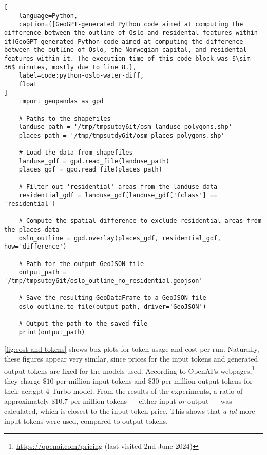 \FloatBarrier

\begin{lstlisting}[
    language=Python,
    caption={[GeoGPT-generated Python code aimed at computing the difference between the outline of Oslo and residental features within it]GeoGPT-generated Python code aimed at computing the difference between the outline of Oslo, the Norwegian capital, and residental features within it. The execution time of this code block was $\sim 36$ minutes, mostly due to line 8.},
    label=code:python-oslo-water-diff,
    float
]
    import geopandas as gpd

    # Paths to the shapefiles
    landuse_path = '/tmp/tmpsutdy6it/osm_landuse_polygons.shp'
    places_path = '/tmp/tmpsutdy6it/osm_places_polygons.shp'
    
    # Load the data from shapefiles
    landuse_gdf = gpd.read_file(landuse_path)
    places_gdf = gpd.read_file(places_path)
    
    # Filter out 'residential' areas from the landuse data
    residential_gdf = landuse_gdf[landuse_gdf['fclass'] == 'residential']
     
    # Compute the spatial difference to exclude residential areas from the places data
    oslo_outline = gpd.overlay(places_gdf, residential_gdf, how='difference')
    
    # Path for the output GeoJSON file
    output_path = '/tmp/tmpsutdy6it/oslo_outline_no_residential.geojson'
    
    # Save the resulting GeoDataFrame to a GeoJSON file
    oslo_outline.to_file(output_path, driver='GeoJSON')
    
    # Output the path to the saved file
    print(output_path)    
\end{lstlisting}

\autoref{fig:cost-and-tokens} shows box plots for token usage and cost per run. Naturally, these figures appear very similar, since prices for the input tokens and generated output tokens are fixed for the models used. According to OpenAI's webpages,\footnote{\url{https://openai.com/pricing} (last visited 2nd June 2024)} they charge $\$10$ per million input tokens and $\$30$ per million output tokens for their \acrshort{acr:gpt}-4 Turbo model. From the results of the experiments, a ratio of approximately $\text{\$}10.7$ per million tokens --- either input \textit{or} output --- was calculated, which is closest to the input token price. This shows that \textit{a lot} more input tokens were used, compared to output tokens.

